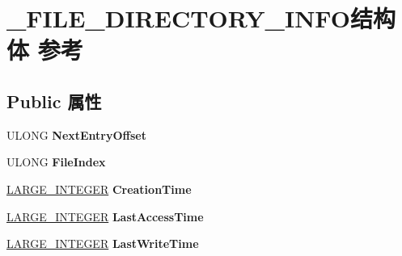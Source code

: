 \hypertarget{struct___f_i_l_e___d_i_r_e_c_t_o_r_y___i_n_f_o}{}\section{\+\_\+\+F\+I\+L\+E\+\_\+\+D\+I\+R\+E\+C\+T\+O\+R\+Y\+\_\+\+I\+N\+F\+O结构体 参考}
\label{struct___f_i_l_e___d_i_r_e_c_t_o_r_y___i_n_f_o}
\subsection*{Public 属性}
\begin{DoxyCompactItemize}
\item 
\mbox{\label{struct___f_i_l_e___d_i_r_e_c_t_o_r_y___i_n_f_o_a3baa7ece3bebe76bde30d1384b39e050}} 
U\+L\+O\+NG {\bfseries Next\+Entry\+Offset}
\item 
\mbox{\label{struct___f_i_l_e___d_i_r_e_c_t_o_r_y___i_n_f_o_a292b90f08855f3abeac707249f5278fd}} 
U\+L\+O\+NG {\bfseries File\+Index}
\item 
\mbox{\label{struct___f_i_l_e___d_i_r_e_c_t_o_r_y___i_n_f_o_a7f8fc343b26b204ec753a15afe673927}} 
\hyperlink{union___l_a_r_g_e___i_n_t_e_g_e_r}{L\+A\+R\+G\+E\+\_\+\+I\+N\+T\+E\+G\+ER} {\bfseries Creation\+Time}
\item 
\mbox{\label{struct___f_i_l_e___d_i_r_e_c_t_o_r_y___i_n_f_o_afb95162566c09a415e03914f13480044}} 
\hyperlink{union___l_a_r_g_e___i_n_t_e_g_e_r}{L\+A\+R\+G\+E\+\_\+\+I\+N\+T\+E\+G\+ER} {\bfseries Last\+Access\+Time}
\item 
\mbox{\label{struct___f_i_l_e___d_i_r_e_c_t_o_r_y___i_n_f_o_a38c3d4e7c834dfcbe15433201fd620b1}} 
\hyperlink{union___l_a_r_g_e___i_n_t_e_g_e_r}{L\+A\+R\+G\+E\+\_\+\+I\+N\+T\+E\+G\+ER} {\bfseries Last\+Write\+Time}
\item 
\mbox{\label{struct___f_i_l_e___d_i_r_e_c_t_o_r_y___i_n_f_o_a5c1634c386b67be704b2b9c3d8be9f65}} 

\end{DoxyCompactItemize}
